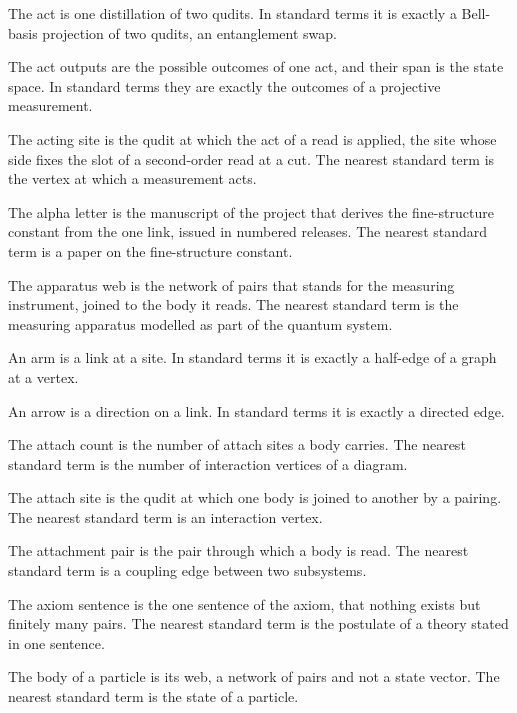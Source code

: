 \begin{description}\setlength{\itemsep}{1pt}
\item[the act] The act is one distillation of two qudits. In standard terms it is exactly a Bell-basis projection of two qudits, an entanglement swap.
\item[the act outputs] The act outputs are the possible outcomes of one act, and their span is the state space. In standard terms they are exactly the outcomes of a projective measurement.
\item[the acting site] The acting site is the qudit at which the act of a read is applied, the site whose side fixes the slot of a second-order read at a cut. The nearest standard term is the vertex at which a measurement acts.
\item[the alpha letter] The alpha letter is the manuscript of the project that derives the fine-structure constant from the one link, issued in numbered releases. The nearest standard term is a paper on the fine-structure constant.
\item[the apparatus web] The apparatus web is the network of pairs that stands for the measuring instrument, joined to the body it reads. The nearest standard term is the measuring apparatus modelled as part of the quantum system.
\item[the arm] An arm is a link at a site. In standard terms it is exactly a half-edge of a graph at a vertex.
\item[the arrow] An arrow is a direction on a link. In standard terms it is exactly a directed edge.
\item[the attach count] The attach count is the number of attach sites a body carries. The nearest standard term is the number of interaction vertices of a diagram.
\item[the attach site] The attach site is the qudit at which one body is joined to another by a pairing. The nearest standard term is an interaction vertex.
\item[the attachment pair] The attachment pair is the pair through which a body is read. The nearest standard term is a coupling edge between two subsystems.
\item[the axiom sentence] The axiom sentence is the one sentence of the axiom, that nothing exists but finitely many pairs. The nearest standard term is the postulate of a theory stated in one sentence.
\item[the body] The body of a particle is its web, a network of pairs and not a state vector. The nearest standard term is the state of a particle.

\end{description}
